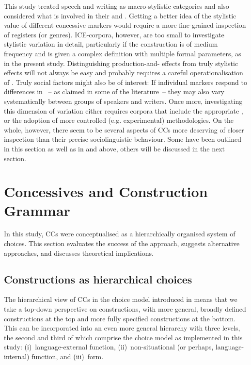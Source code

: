 This study treated speech and writing as macro-stylistic categories and also considered what is involved in their  and . Getting a better idea of the stylistic value of different concessive markers would require a more fine-grained inspection of registers (or genres). ICE-corpora, however, are too small to investigate stylistic variation in detail, particularly if the construction is of medium frequency and is given a complex definition with multiple formal parameters, as in the present study. Distinguishing production-and- effects from truly stylistic effects will not always be easy and probably requires a careful operationalisation of . Truly social factors might also be of interest: If individual markers respond to differences in ~– as claimed in some of the literature~– they may also vary systematically between groups of speakers and writers. Once more, investigating this dimension of variation either requires corpora that include the appropriate , or the adoption of more controlled (e.g. experimental) methodologies. On the whole, however, there seem to be several aspects of CCs more deserving of closer inspection than their precise sociolinguistic behaviour. Some have been outlined in this section as well as in  and  above, others will be discussed in the next section.

\section{\label{bkm:Ref82691473}Concessives and Construction Grammar}\label{sec:12.3}

In this study, CCs were conceptualised as a hierarchically organised system of choices. This section evaluates the success of the approach, suggests alternative approaches, and discusses theoretical implications.

\subsection{\label{bkm:Ref81558829}Constructions as hierarchical choices}\label{sec:12.3.1}

The hierarchical view of CCs in the choice model introduced in  means that we take a top-down perspective on constructions, with more general, broadly defined constructions at the top and more fully specified constructions at the bottom. This can be incorporated into an even more general hierarchy with three levels, the second and third of which comprise the choice model as implemented in this study:
(i)~language-external function,
(ii)~non-situational (or perhaps, language-internal) function, and
(iii)~form.

